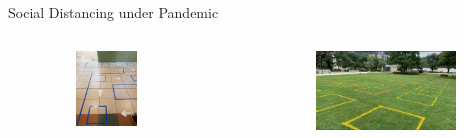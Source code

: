 \begin{frame}{Social Distancing under Pandemic}
\begin{itemize}
      \begin{columns}[c]  %
        \column{5.5cm}  %
        \begin{figure}[ht]
          \centering
          \includegraphics[width = 0.7\textwidth, height=0.5\textwidth]{./images/social_distancie_tape.jpg}
        \end{figure}
        \column{4.5cm}
        \scriptsize
        \begin{figure}[ht]
          \centering
          \includegraphics[width = 0.9\textwidth]{./images/socail_park.png}
        \end{figure}
        \end{columns} 
  \end{itemize}
  \end{frame}

